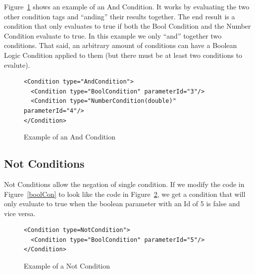 Figure~\ref{andCon} shows an example of an And Condition. It works by evaluating the two other condition tags and ``anding'' their results together. The end result is a
condition that only evaluates to true if both the Bool Condition and the Number Condition evaluate to true. In this example we only ``and'' together two conditions. That said,
an arbitrary amount of conditions can have a Boolean Logic Condition applied to them (but there must be at least two conditions to evalute).
\begin{figure}
\centering
{\footnotesize
\begin{Verbatim}
<Condition type="AndCondition">
  <Condition type="BoolCondition" parameterId="3"/>
  <Condition type="NumberCondition(double)" parameterId="4"/>
</Condition>
\end{Verbatim}
}
\caption{Example of an And Condition}
\label{andCon}
\end{figure}

\subsection{Not Conditions}
Not Conditions allow the negation of single condition. If we modify the code in Figure~\ref{boolCon} to look like the code in Figure~\ref{notCon}, we get a 
condition that will only evaluate to true when the boolean parameter with an Id of 5 is false and vice versa. 
\begin{figure}
\centering
{\footnotesize
\begin{Verbatim}
<Condition type=NotCondition">
  <Condition type="BoolCondition" parameterId="5"/>
</Condition>
\end{Verbatim}
}
\caption{Example of a Not Condition}
\label{notCon}
\end{figure}

